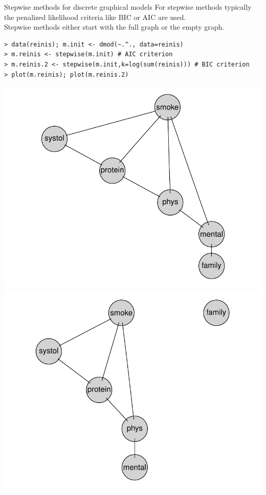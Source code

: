 \documentclass[11pt,handout,aspectratio=169,dvipsnames]{beamer}
\begin{document}
\begin{frame}[fragile]{Stepwise methods for discrete graphical models}
	For stepwise methods  typically the penalized likelihood criteria like BIC or AIC are used.\\[.3cm]
	Stepwise methods either start with the full graph or the empty graph.
		\begin{lstlisting}
> data(reinis); m.init <- dmod(~.^., data=reinis)
> m.reinis <- stepwise(m.init) # AIC criterion
> m.reinis.2 <- stepwise(m.init,k=log(sum(reinis))) # BIC criterion
> plot(m.reinis); plot(m.reinis.2)		
\end{lstlisting}
\begin{center}
	\includegraphics[scale=.3]{pics/reinis}\qquad\qquad \includegraphics[scale=.3]{pics/reinis2}
\end{center}
\end{frame}
\end{document}
